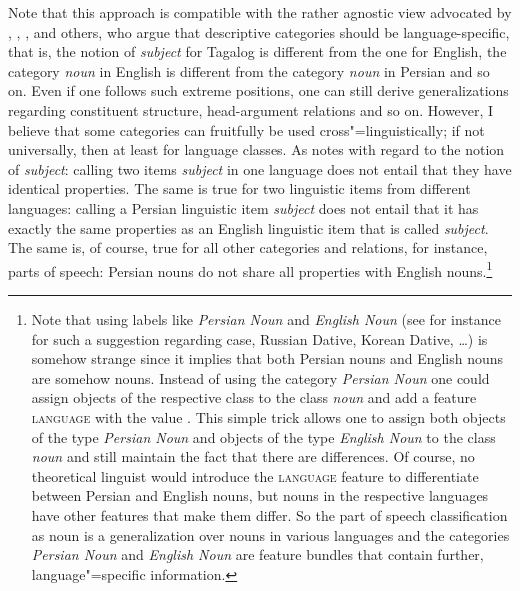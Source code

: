 Note that this approach is compatible with the rather agnostic view advocated by
\citet{Haspelmath2010a}, \citet{Dryer97a-u}, \citet[Section~1.4.2--1.4.3]{Croft2001a}, and others, who argue that descriptive categories should be
language-specific, that is, the notion of \emph{subject} for Tagalog is different from the one for English,
the category \emph{noun} in English is different from the category \emph{noun} in Persian and so on. Even if one
follows such extreme positions, one can still derive generalizations regarding constituent structure,
head-argument relations and so on. However, I believe that some categories can fruitfully be used
cross"=linguistically; if not universally, then at least for language classes. As \citet[]{Newmeyer2010a} notes with regard to the notion of \emph{subject}: calling two items \emph{subject}
in one language does not entail that they have identical properties. The same is true for two
linguistic items from different languages: calling a Persian linguistic item \emph{subject} does not entail
that it has exactly the same properties as an English linguistic item that is called
\emph{subject}. The same is, of course, true for all other categories and relations, for instance, parts of speech:
Persian nouns do not share all properties with English nouns.\footnote{
  Note that using labels like \emph{Persian Noun} and \emph{English Noun} (see for instance
  \citealp[Section~2]{Haspelmath2010a} for such a suggestion regarding case, \eg Russian Dative,
  Korean Dative, \ldots) is somehow strange since
  it implies that both Persian nouns and English nouns are somehow nouns. Instead of using the
  category \emph{Persian Noun} one could assign objects of the respective class to the class
  \emph{noun} and add a feature \textsc{language} with the value . This simple trick
  allows one to assign both objects of the type \emph{Persian Noun} and objects of the type
  \emph{English Noun} to the class \emph{noun} and still maintain the fact that there are
  differences. Of course, no theoretical linguist would introduce the \textsc{language} feature to
  differentiate between Persian and English nouns, but nouns in the respective languages have other features that
  make them differ. So the part of speech classification as noun is a generalization over nouns in
  various languages and the categories \emph{Persian Noun} and \emph{English Noun} are feature
  bundles that contain further, language"=specific information.

}
